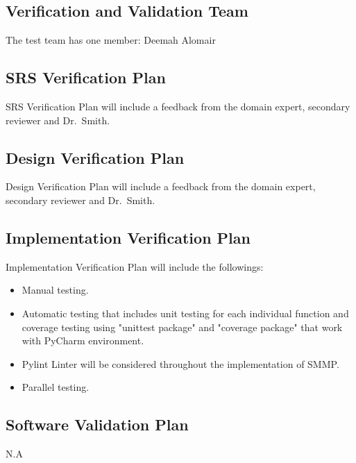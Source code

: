 \documentclass[12pt, titlepage]{article}
\begin{document}
\subsection{Verification and Validation Team}

The test team has one member: Deemah Alomair


\subsection{SRS Verification Plan}

SRS Verification Plan will include a feedback from the domain expert, secondary
reviewer and Dr.\ Smith.


\subsection{Design Verification Plan}

Design Verification Plan will include a feedback from the domain expert,
secondary reviewer and Dr.\ Smith.

\subsection{Implementation Verification Plan}

Implementation Verification Plan will include the followings:
\begin{itemize}
\item Manual testing.
\item  Automatic testing that includes unit testing for each individual function and coverage testing using "unittest package" and "coverage package" that work with PyCharm environment.
\item  Pylint Linter will be considered throughout the implementation of SMMP.  
\item Parallel testing. 
\end{itemize}

\subsection{Software Validation Plan} N.A 
\end{document}
